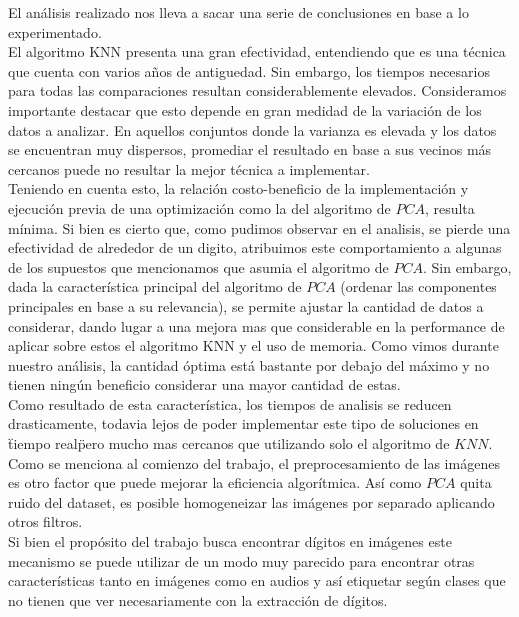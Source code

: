 El análisis realizado nos lleva a sacar una serie de conclusiones en base a lo experimentado.
\\
El algoritmo KNN presenta una gran efectividad, entendiendo que es una técnica que cuenta con varios años de antiguedad. Sin embargo, los tiempos necesarios para todas las comparaciones resultan considerablemente elevados.
Consideramos importante destacar que esto depende en gran medidad de la variación de los datos a analizar. En aquellos conjuntos donde la varianza es elevada y los datos se encuentran muy dispersos, promediar el resultado en base a sus vecinos más cercanos puede no resultar la mejor técnica a implementar.
\\
Teniendo en cuenta esto, la relación costo-beneficio de la implementación y ejecución previa de una optimización como la del algoritmo de $PCA$, resulta mínima. Si bien es cierto que, como pudimos observar en el analisis, se pierde una efectividad de alrededor de un digito, atribuimos este comportamiento a algunas de los supuestos que mencionamos que asumia el algoritmo de $PCA$.
Sin embargo, dada la característica principal del algoritmo de $PCA$ (ordenar las componentes principales en base a su relevancia), se permite ajustar la cantidad de datos a considerar, dando lugar a una mejora mas que considerable en la performance de aplicar sobre estos el algoritmo KNN y el uso de memoria. Como vimos durante nuestro análisis, la cantidad óptima está bastante por debajo del máximo y no tienen ningún beneficio considerar una mayor cantidad de estas.
\\
Como resultado de esta característica, los tiempos de analisis se reducen drasticamente, todavia lejos de poder implementar este tipo de soluciones en \"tiempo real\" pero mucho mas cercanos que utilizando solo el algoritmo de $KNN$.
\\
Como se menciona al comienzo del trabajo, el preprocesamiento de las imágenes es otro factor que puede mejorar la eficiencia algorítmica. Así como $PCA$ quita ruido del dataset, es posible homogeneizar las imágenes por separado aplicando otros filtros.
\\
Si bien el propósito del trabajo busca encontrar dígitos en imágenes este mecanismo se puede utilizar de un modo muy parecido para encontrar otras características tanto en imágenes como en audios y así etiquetar según clases que no tienen que ver necesariamente con la extracción de dígitos. 
